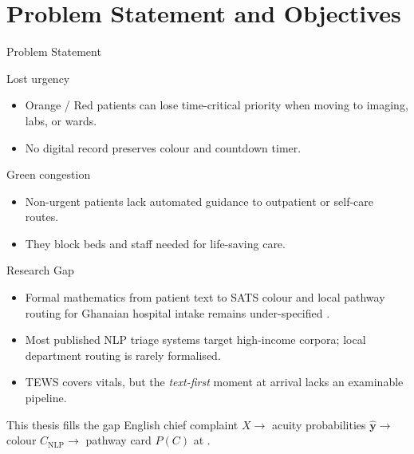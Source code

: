 \section{Problem Statement and Objectives}

\begin{frame}{Problem Statement}
	\begin{block}{Lost urgency}
		\begin{itemize}
			\item Orange / Red patients can lose time-critical priority when moving to imaging, labs, or wards.
			\item No digital record preserves colour and countdown timer.
		\end{itemize}
	\end{block}
	\begin{block}{Green congestion}
		\begin{itemize}
			\item Non-urgent patients lack automated guidance to outpatient or self-care routes.
			\item They block beds and staff needed for life-saving care.
		\end{itemize}
	\end{block}
\end{frame}

\begin{frame}{Research Gap}
	\begin{itemize}
		\item Formal mathematics from patient text to SATS colour and local pathway routing for Ghanaian hospital intake remains under-specified \citep{stewart2023nlp,gligorijevic2018deep}.
		\item Most published NLP triage systems target high-income corpora; local department routing is rarely formalised.
		\item TEWS covers vitals, but the \emph{text-first} moment at arrival lacks an examinable pipeline.
	\end{itemize}
	\begin{alertblock}{This thesis fills the gap}
		English chief complaint \(X \to\) acuity probabilities \(\hat{\mathbf{y}} \to\) colour \(C_{\mathrm{NLP}} \to\) pathway card \(P(C)\) at \examplehospital{}.
	\end{alertblock}
\end{frame}

